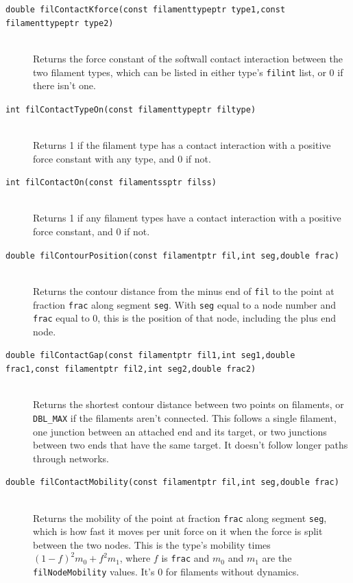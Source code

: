 \documentclass {scrbook}
\newcommand {\ttt} {\texttt}
\begin{document}
\begin{description}
\item[\ttt{double filContactKforce(const filamenttypeptr type1,const filamenttypeptr type2)}] %
\hfill \\
Returns the force constant of the softwall contact interaction between the two filament types, which can be listed in either type's \ttt{filint} list, or 0 if there isn't one.

\item[\ttt{int filContactTypeOn(const filamenttypeptr filtype)}] %
\hfill \\
Returns 1 if the filament type has a contact interaction with a positive force constant with any type, and 0 if not.

\item[\ttt{int filContactOn(const filamentssptr filss)}] %
\hfill \\
Returns 1 if any filament types have a contact interaction with a positive force constant, and 0 if not.

\item[\ttt{double filContourPosition(const filamentptr fil,int seg,double frac)}] %
\hfill \\
Returns the contour distance from the minus end of \ttt{fil} to the point at fraction \ttt{frac} along segment \ttt{seg}. With \ttt{seg} equal to a node number and \ttt{frac} equal to 0, this is the position of that node, including the plus end node.

\item[\ttt{double filContactGap(const filamentptr fil1,int seg1,double frac1,const filamentptr fil2,int seg2,double frac2)}] %
\hfill \\
Returns the shortest contour distance between two points on filaments, or \ttt{DBL\_MAX} if the filaments aren't connected. This follows a single filament, one junction between an attached end and its target, or two junctions between two ends that have the same target. It doesn't follow longer paths through networks.

\item[\ttt{double filContactMobility(const filamentptr fil,int seg,double frac)}] %
\hfill \\
Returns the mobility of the point at fraction \ttt{frac} along segment \ttt{seg}, which is how fast it moves per unit force on it when the force is split between the two nodes. This is the type's mobility times $(1-f)^2m_0+f^2m_1$, where $f$ is \ttt{frac} and $m_0$ and $m_1$ are the \ttt{filNodeMobility} values. It's 0 for filaments without dynamics.


\end{description}
\end{document}
